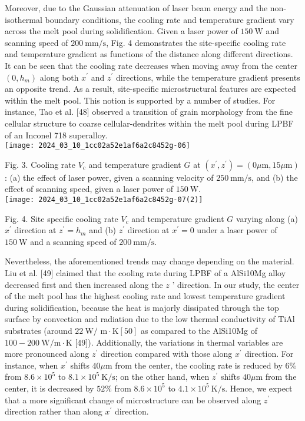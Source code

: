 \documentclass[10pt]{article}
\begin{document}
Moreover, due to the Gaussian attenuation of laser beam energy and the non-isothermal boundary conditions, the cooling rate and temperature gradient vary across the melt pool during solidification. Given a laser power of $150 \mathrm{~W}$ and scanning speed of $200 \mathrm{~mm} / \mathrm{s}$, Fig. 4 demonstrates the site-specific cooling rate and temperature gradient as functions of the distance along different directions. It can be seen that the cooling rate decreases when moving away from the center $\left(0, h_{m}\right)$ along both $x^{\prime}$ and $z^{\prime}$ directions, while the temperature gradient presents an opposite trend. As a result, site-specific microstructural features are expected within the melt pool. This notion is supported by a number of studies. For instance, Tao et al. [48] observed a transition of grain morphology from the fine cellular structure to coarse cellular-dendrites within the melt pool during LPBF of an Inconel 718 superalloy.\\
\texttt{[image: 2024\_03\_10\_1cc02a52e1af6a2c8452g-06]}

Fig. 3. Cooling rate $V_{c}$ and temperature gradient $G$ at $\left(x^{\prime}, z^{\prime}\right)=(0 \mu \mathrm{m}, 15 \mu \mathrm{m})$ : (a) the effect of laser power, given a scanning velocity of $250 \mathrm{~mm} / \mathrm{s}$, and (b) the effect of scanning speed, given a laser power of $150 \mathrm{~W}$.\\
\texttt{[image: 2024\_03\_10\_1cc02a52e1af6a2c8452g-07(2)]}

Fig. 4. Site specific cooling rate $V_{c}$ and temperature gradient $G$ varying along (a) $x^{\prime}$ direction at $z^{\prime}=h_{m}$ and (b) $z^{\prime}$ direction at $x^{\prime}=0$ under a laser power of $150 \mathrm{~W}$ and a scanning speed of $200 \mathrm{~mm} / \mathrm{s}$.

Nevertheless, the aforementioned trends may change depending on the material. Liu et al. [49] claimed that the cooling rate during LPBF of a AlSi10Mg alloy decreased first and then increased along the $z$ ' direction. In our study, the center of the melt pool has the highest cooling rate and lowest temperature gradient during solidification, because the heat is majorly dissipated through the top surface by convection and radiation due to the low thermal conductivity of TiAl substrates (around $22 \mathrm{~W} /$ $\mathrm{m} \cdot \mathrm{K}[50]$ as compared to the AlSi10Mg of $100-200 \mathrm{~W} / \mathrm{m} \cdot \mathrm{K}$ [49]). Additionally, the variations in thermal variables are more pronounced along $z^{\prime}$ direction compared with those along $x^{\prime}$ direction. For instance, when $x^{\prime}$ shifts $40 \mu \mathrm{m}$ from the center, the cooling rate is reduced by $6 \%$ from $8.6 \times 10^{5}$ to $8.1 \times 10^{5} \mathrm{~K} / \mathrm{s}$; on the other hand, when $z^{\prime}$ shifts $40 \mu \mathrm{m}$ from the center, it is decreased by $52 \%$ from $8.6 \times 10^{5}$ to $4.1 \times 10^{5} \mathrm{~K} / \mathrm{s}$. Hence, we expect that a more significant change of microstructure can be observed along $z^{\prime}$ direction rather than along $x^{\prime}$ direction.
\end{document}

